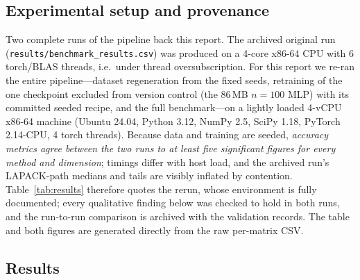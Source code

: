\documentclass[11pt,a4paper]{article}
\begin{document}
\subsection{Experimental setup and provenance}

Two complete runs of the pipeline back this report. The archived original run
(\texttt{results/benchmark\_results.csv}) was produced on a 4-core x86-64 CPU
with 6 torch/BLAS threads, i.e.\ under thread oversubscription. For this
report we re-ran the entire pipeline---dataset regeneration from the fixed
seeds, retraining of the one checkpoint excluded from version control (the
86\,MB $n{=}100$ MLP) with its committed seeded recipe, and the full
benchmark---on a lightly loaded 4-vCPU x86-64 machine (Ubuntu 24.04, Python
3.12, NumPy 2.5, SciPy 1.18, PyTorch 2.14-CPU, 4 torch threads). Because data
and training are seeded, \emph{accuracy metrics agree between the two runs to
at least five significant figures for every method and dimension}; timings
differ with host load, and the archived run's LAPACK-path medians and tails
are visibly inflated by contention. Table~\ref{tab:results} therefore quotes
the rerun, whose environment is fully documented; every qualitative finding
below was checked to hold in both runs, and the run-to-run comparison is
archived with the validation records. The table and both figures are
generated directly from the raw per-matrix CSV.

\subsection{Results}
\end{document}
